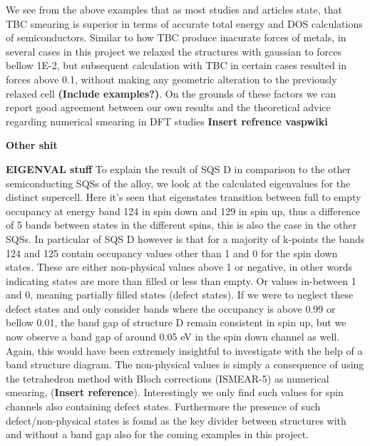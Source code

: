 We see from the above examples that as most studies and articles state, that TBC smearing is superior in terms of accurate total energy and DOS calculations of semiconductors. Similar to how TBC produce inacurate forces of metals, in several cases in this project we relaxed the structures with gaussian to forces bellow 1E-2, but subsequent calculation with TBC in certain cases resulted in forces above 0.1, without making any geometric alteration to the previously relaxed cell \textbf{(Include examples?)}. On the grounds of these factors we can report good agreement between our own results and the theoretical advice regarding numerical smearing in DFT studies \textbf{Insert refrence vaspwiki}

\textbf{Other shit}

\textbf{EIGENVAL stuff}
To explain the result of SQS D in comparison to the other semiconducting SQSs of the alloy, we look at the calculated eigenvalues for the distinct supercell. Here it's seen that eigenstates transition between full to empty occupancy at energy band 124 in spin down and 129 in spin up, thus a difference of 5 bands between states in the different spins, this is also the case in the other SQSs. In particular of SQS D however is that for a majority of k-points the bands 124 and 125 contain occupancy values other than 1 and 0 for the spin down states. These are either non-physical values above 1 or negative, in other words indicating states are more than filled or less than empty. Or values in-between 1 and 0, meaning partially filled states (defect states). If we were to neglect these defect states and only consider bands where the occupancy is above 0.99 or bellow 0.01, the band gap of structure D remain consistent in spin up, but we now observe a band gap of around 0.05 eV in the spin down channel as well. Again, this would have been extremely insightful to investigate with the help of a band structure diagram. The non-physical values is simply a consequence of using the tetrahedron method with Bloch corrections (ISMEAR-5) as numerical smearing, (\textbf{Insert reference}). Interestingly we only find such values for spin channels also containing defect states. Furthermore the presence of such defect/non-physical states is found as the key divider between structures with and without a band gap also for the coming examples in this project. \\\\


